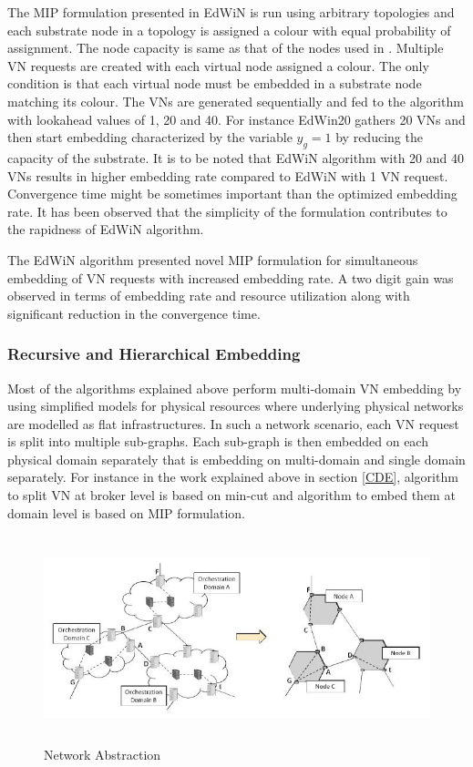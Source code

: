 \documentclass[article,dr=phil,type=msc ,colorback,accentcolor=tud4b]{tudthesis}
\begin{document}
The MIP formulation presented in EdWiN is run using arbitrary topologies and each substrate node in a topology is assigned a colour with equal probability of assignment. The node capacity is same as that of the nodes used in \cite{vn_multiple}. Multiple VN requests are created with each virtual node assigned a colour. The only condition is that each virtual node must be embedded in a substrate node matching its colour. The VNs are generated sequentially and fed to the algorithm with lookahead values of 1, 20 and 40. For instance EdWin20 gathers 20 VNs and then start embedding characterized by the variable $y_{g} = 1$ by reducing the  capacity of the substrate. It is to be noted that EdWiN algorithm with 20 and 40 VNs results in higher embedding rate compared to EdWiN with 1 VN request. Convergence time might be sometimes important than the optimized embedding rate. It has been observed that the simplicity of the formulation contributes to the rapidness of EdWiN algorithm.\newline

The EdWiN algorithm presented novel MIP formulation for simultaneous embedding of VN requests with increased embedding rate. A two digit gain was observed in terms of embedding rate and resource utilization along with significant reduction in the convergence time. 
 
\subsubsection{Recursive and Hierarchical Embedding} \label{md_monitoring}

Most of the algorithms explained above perform multi-domain VN embedding by using simplified models for physical resources where underlying physical networks are modelled as flat infrastructures. In such a network scenario, each VN request is split into multiple sub-graphs. Each sub-graph is then embedded on each physical domain separately that is embedding on multi-domain and single domain separately. For instance in the work explained above in section \ref{CDE}, algorithm to split VN at broker level is based on min-cut and algorithm to embed them at domain level is based on MIP formulation.  
\begin{figure}[h]
	\centering
	\includegraphics[width=12cm, height=6cm]{nw_abst.jpg}
	\caption{Network Abstraction}
	\label{fig: nw_abst}
\end{figure}
\end{document}
